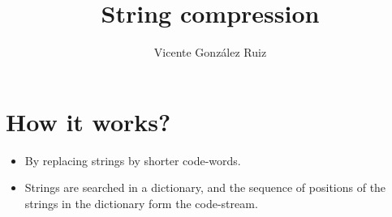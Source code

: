 \title{String compression}
\author{Vicente González Ruiz}
\maketitle
\tableofcontents

\section{How it works?}
\begin{itemize}
\item By replacing strings by shorter code-words.
\item Strings are searched in a dictionary, and the sequence of
  positions of the strings in the dictionary form the code-stream.
\end{itemize}

\section{}
\section{}
\section{}


